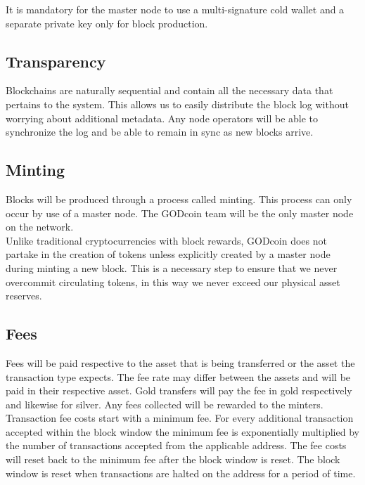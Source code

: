 \documentclass[12pt,a4paper]{article}
\begin{document}
  It is mandatory for the master node to use a multi-signature cold wallet and a
  separate private key only for block production.

  \subsection{Transparency}
  Blockchains are naturally sequential and contain all the necessary data that
  pertains to the system. This allows us to easily distribute the block log
  without worrying about additional metadata. Any node operators will be able to
  synchronize the log and be able to remain in sync as new blocks arrive.

  \subsection{Minting}
  Blocks will be produced through a process called minting. This process can
  only occur by use of a master node. The GODcoin team will be the only master
  node on the network.\\

  Unlike traditional cryptocurrencies with block rewards, GODcoin does not
  partake in the creation of tokens unless explicitly created by a master node
  during minting a new block. This is a necessary step to ensure that we never
  overcommit circulating tokens, in this way we never exceed our physical asset
  reserves.

  \subsection{Fees}
  Fees will be paid respective to the asset that is being transferred or the
  asset the transaction type expects. The fee rate may differ between the assets
  and will be paid in their respective asset. Gold transfers will pay the fee in
  gold respectively and likewise for silver. Any fees collected will be rewarded
  to the minters.\\

  Transaction fee costs start with a minimum fee. For every additional
  transaction accepted within the block window the minimum fee is exponentially
  multiplied by the number of transactions accepted from the applicable address.
  The fee costs will reset back to the minimum fee after the block window is
  reset. The block window is reset when transactions are halted on the address
  for a period of time.\\
\end{document}
